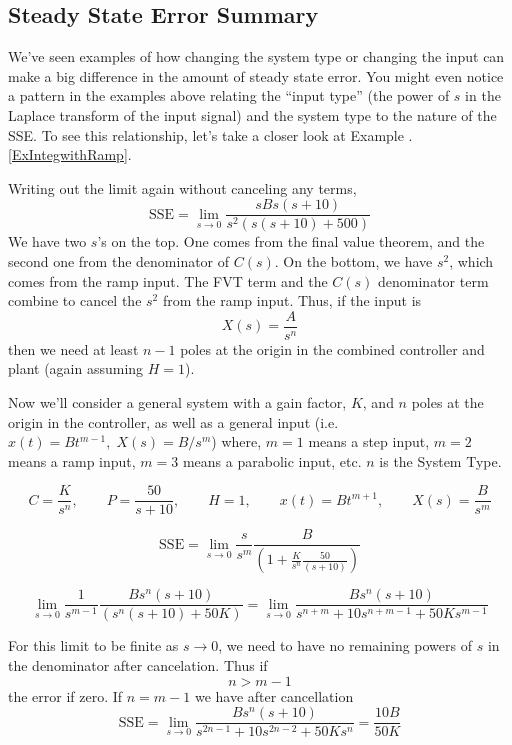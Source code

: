 \subsection{Steady State Error Summary}

We've seen examples of how changing the system type or changing the input can make a big difference in the amount of steady state error.  You might even notice a pattern in the examples above relating the ``input type'' (the power of $s$ in the Laplace transform of the input signal) and the system type to the nature of the SSE.  To see this relationship, let's take a closer look at Example \thechapter.\ref{ExIntegwithRamp}.

Writing out the limit again without canceling any terms,
\[
\mathrm{SSE} = \lim_{s\to 0} \frac{sBs(s+10)}{s^2(s(s+10)+500)}
\]
We have two $s$'s on the top.  One comes from the final value theorem, and the second one from the denominator of $C(s)$.  On the bottom, we have $s^2$, which comes from the ramp input.    The FVT term and the $C(s)$ denominator term combine to cancel the $s^2$ from the ramp input.   Thus, if the input is
\[
X(s) = \frac{A}{s^n}
\]
then we need at least $n-1$ poles at the origin in the combined controller and plant (again assuming $H=1$).


\begin{ExampleSmall}
Now we'll consider a general system with a gain factor, $K$, and $n$ poles at the origin in the controller,
as well as a general input (i.e. $x(t) = Bt^{m-1},\; X(s) = B/s^m $) where, $m=1$ means a step input, $m=2 $ means a ramp input, $m=3$ means a parabolic input, etc.  $n$ is the System Type.

\[
C = \frac{K}{s^n}, \qquad P = \frac{50}{s+10}, \qquad H = 1, \qquad x(t) = Bt^{m+1}, \qquad X(s) = \frac{B}{s^m}
\]

\[
\mathrm{SSE} = \lim_{s\to 0} \frac{s}{s^m} \frac{B}{\left(1+\frac{K}{s^n}\frac{50}{(s+10)}\right) }
\]

\[
\lim_{s\to 0} \frac{1}{s^{m-1}} \frac {Bs^n(s+10)} {(s^n(s+10)+50K)} = \lim_{s\to 0} \frac{Bs^n(s+10)} {s^{n+m}+10s^{n+m-1} + 50Ks^{m-1}}
\]


For this limit to be finite as $s\to 0$, we need to have no remaining powers of $s$ in the denominator after cancelation.  Thus  if
\[
n > m-1
\]
the error if zero.   If $n=m-1$ we have after cancellation
\[
\mathrm{SSE} = \lim_{s\to 0} \frac  {Bs^n(s+10)}   {s^{2n-1} + 10s^{2n-2} + 50Ks^n} = \frac {10B}  {50K}
\]
\end{ExampleSmall}



